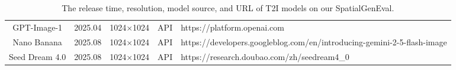 \begin{table}[t]
{\begin{tabular}{cc|ccl}
        \multicolumn{1}{c|}{GPT-Image-1} & 2025.04 & \multicolumn{1}{c|}{1024$\times$1024} & \multicolumn{1}{c|}{API} &  https://platform.openai.com \\ 
        \multicolumn{1}{c|}{{Nano Banana}} & {2025.08} & \multicolumn{1}{c|}{{1024$\times$1024}} & \multicolumn{1}{c|}{{API}} &  {https://developers.googleblog.com/en/introducing-gemini-2-5-flash-image} \\ 
        \multicolumn{1}{c|}{{Seed Dream 4.0}} & {2025.08} & \multicolumn{1}{c|}{{1024$\times$1024}} & \multicolumn{1}{c|}{{API}} &  {https://research.doubao.com/zh/seedream4\_0} \\ 
        \bottomrule
        \end{tabular}
    }
    \caption{The release time, resolution, model source, and URL of T2I models on our SpatialGenEval.}
    \label{tab:model_source}
    \vspace{-0.3cm}
\end{table}